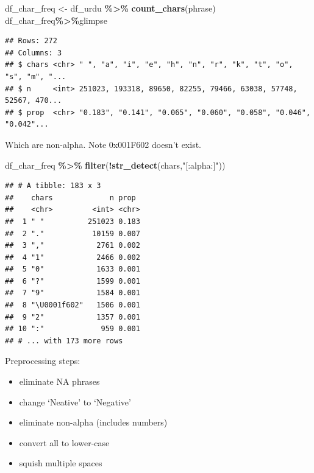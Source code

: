 \documentclass[
]{article}
\newenvironment{Shaded}{\begin{snugshade}}{\end{snugshade}}
\newcommand{\KeywordTok}[1]{\textcolor[rgb]{0.13,0.29,0.53}{\textbf{#1}}}
\newcommand{\NormalTok}[1]{#1}
\newcommand{\OperatorTok}[1]{\textcolor[rgb]{0.81,0.36,0.00}{\textbf{#1}}}
\newcommand{\StringTok}[1]{\textcolor[rgb]{0.31,0.60,0.02}{#1}}
\providecommand{\tightlist}{%
  \setlength{\itemsep}{0pt}\setlength{\parskip}{0pt}}
\begin{document}
\begin{Shaded}
\begin{Highlighting}[]
\NormalTok{df\_char\_freq \textless{}{-}}\StringTok{ }\NormalTok{df\_urdu }\OperatorTok{\%\textgreater{}\%}\StringTok{ }\KeywordTok{count\_chars}\NormalTok{(phrase)}
\NormalTok{df\_char\_freq}\OperatorTok{\%\textgreater{}\%}\NormalTok{glimpse}
\end{Highlighting}
\end{Shaded}

\begin{verbatim}
## Rows: 272
## Columns: 3
## $ chars <chr> " ", "a", "i", "e", "h", "n", "r", "k", "t", "o", "s", "m", "...
## $ n     <int> 251023, 193318, 89650, 82255, 79466, 63038, 57748, 52567, 470...
## $ prop  <chr> "0.183", "0.141", "0.065", "0.060", "0.058", "0.046", "0.042"...
\end{verbatim}

Which are non-alpha. Note 0x001F602 doesn't exist.

\begin{Shaded}
\begin{Highlighting}[]
\NormalTok{df\_char\_freq }\OperatorTok{\%\textgreater{}\%}\StringTok{ }\KeywordTok{filter}\NormalTok{(}\OperatorTok{!}\KeywordTok{str\_detect}\NormalTok{(chars,}\StringTok{"[:alpha:]"}\NormalTok{))}
\end{Highlighting}
\end{Shaded}

\begin{verbatim}
## # A tibble: 183 x 3
##    chars             n prop 
##    <chr>         <int> <chr>
##  1 " "          251023 0.183
##  2 "."           10159 0.007
##  3 ","            2761 0.002
##  4 "1"            2466 0.002
##  5 "0"            1633 0.001
##  6 "?"            1599 0.001
##  7 "9"            1584 0.001
##  8 "\U0001f602"   1506 0.001
##  9 "2"            1357 0.001
## 10 ":"             959 0.001
## # ... with 173 more rows
\end{verbatim}

Preprocessing steps:

\begin{itemize}
\tightlist
\item
  eliminate NA phrases
\item
  change `Neative' to `Negative'
\item
  eliminate non-alpha (includes numbers)
\item
  convert all to lower-case
\item
  squish multiple spaces
\end{itemize}
\end{document}
